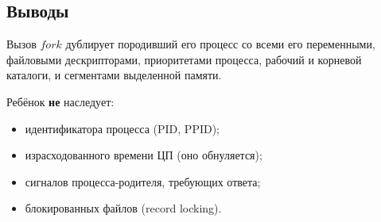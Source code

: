 \documentclass[12pt]{article}
\begin{document}
\subsection*{Выводы}

Вызов $fork$ дублирует породивший его процесс со всеми его переменными, файловыми дескрипторами, приоритетами процесса, рабочий и корневой каталоги, и сегментами выделенной памяти.

Ребёнок {\bf не} наследует:
\begin{itemize}
    \item идентификатора процесса (PID, PPID);
    \item израсходованного времени ЦП (оно обнуляется);
    \item сигналов процесса-родителя, требующих ответа;
    \item блокированных файлов (record locking).
\end{itemize}
\end{document}
